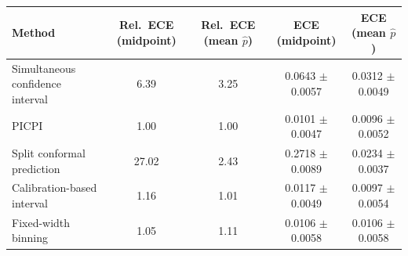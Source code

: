 \begin{tabular}{lcccc}
\toprule
Method & Rel.\ ECE (midpoint) & Rel.\ ECE (mean $\hat p$) & ECE (midpoint) & ECE (mean $\hat p$) \\
\midrule
Simultaneous confidence interval & 6.39 & 3.25 & 0.0643 $\pm$ 0.0057 & 0.0312 $\pm$ 0.0049 \\
PICPI & 1.00 & 1.00 & 0.0101 $\pm$ 0.0047 & 0.0096 $\pm$ 0.0052 \\
Split conformal prediction & 27.02 & 2.43 & 0.2718 $\pm$ 0.0089 & 0.0234 $\pm$ 0.0037 \\
Calibration-based interval & 1.16 & 1.01 & 0.0117 $\pm$ 0.0049 & 0.0097 $\pm$ 0.0054 \\
Fixed-width binning & 1.05 & 1.11 & 0.0106 $\pm$ 0.0058 & 0.0106 $\pm$ 0.0058 \\
\bottomrule
\end{tabular}
